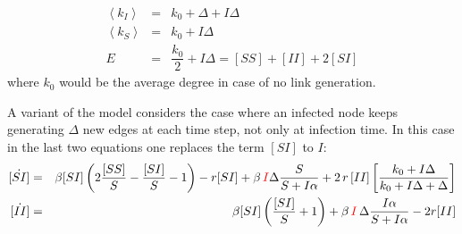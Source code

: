 \documentclass[11pt,final]{article}
\newcommand{\red}[1]{{\color{red}{#1}\normalcolor}}
\newcommand{\bea}{\begin{eqnarray}}
\newcommand{\eea}{\end{eqnarray}}
\newcommand{\f}[2]{\dfrac{#1}{#2}}
\newcommand{\avg}[1]{\left\langle #1 \right\rangle} %
\newcommand{\al}{\alpha}
\newcommand{\dl}{\Delta}
\newcommand{\rup}[1]{\left(#1\right)}
\newcommand{\bup}[1]{\left[#1\right]}
\begin{document}
\bea
\avg{k_{I}}&=& k_{0}+\dl +I\dl\\
\avg{k_{S}}&=& k_{0}+I \dl \\
E&=&\f{k_{0}}{2} +I\dl = [SS]+[II]+2[SI]
\eea
where $k_{0}$ would be the average degree in case of no link generation. 

A variant of the model considers the case where an infected node keeps generating $\dl$ new edges at each time step, not only at infection time. In this case in the last two equations one replaces the term $[SI]$ to $I$:
\bea
\dot{[SI]}&=& \beta[SI] \rup{ 2\f{[SS]}{S} -\f{[SI]}{S}-1} -r[SI] +\beta \,\red{I}\dl  \f{S}{S+I\al} +2\,r\,[II]  \bup{\f{k_{0}+I \Delta}{k_{0}+I \Delta +\Delta}} \\
\dot{[II]}&=& \beta[SI] \rup{\f{[SI]}{S} +1} +\beta\,\red{I}\, \dl \f{I\al}{S+I\al} -2r [II]
\eea

{}

\end{document}
